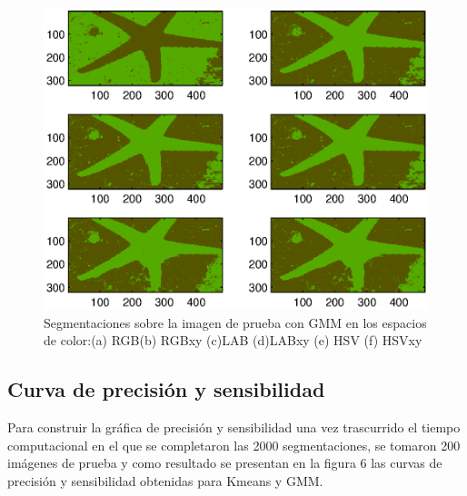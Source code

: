 \documentclass[10pt,twocolumn,letterpaper]{article}
\begin{document}
\begin{figure}[t]
\begin{center}
   \includegraphics[width=1\linewidth]{seg_colorspacegmm.eps}
\end{center}
   \caption{Segmentaciones sobre la imagen de prueba con GMM en los espacios de color:(a) RGB(b) RGBxy (c)LAB (d)LABxy (e) HSV (f) HSVxy }
\label{fig:seg}
\end{figure}

\subsection{Curva de precisión y sensibilidad}

Para construir la gráfica de precisión y sensibilidad una vez trascurrido el tiempo computacional en el que se completaron las 2000 segmentaciones, se tomaron 200 imágenes de prueba y como resultado se presentan en la figura 6 las curvas de precisión y sensibilidad obtenidas para Kmeans y GMM.
\end{document}
